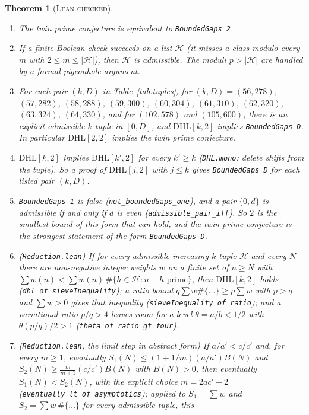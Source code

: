 \documentclass[11pt]{amsart}
\newtheorem{theorem}{Theorem}
\theoremstyle{definition}
\theoremstyle{remark}
\newcommand{\lbl}[1]{\textup{\textsc{#1}}}
\newcommand{\DHL}{\mathrm{DHL}}
\begin{document}
\begin{theorem}[\lbl{Lean-checked}]\label{thm:lean}
\begin{enumerate}
\item The twin prime conjecture is equivalent to \texttt{BoundedGaps 2}.
\item If a finite Boolean check succeeds on a list $\mathcal H$ (it misses a
class modulo every $m$ with $2\le m\le|\mathcal H|$), then $\mathcal H$ is
admissible. The moduli $p>|\mathcal H|$ are handled by a formal pigeonhole
argument.
\item For each pair $(k,D)$ in Table~\ref{tab:tuples}, for
$(k,D)=(56,278)$, $(57,282)$, $(58,288)$, $(59,300)$, $(60,304)$, $(61,310)$,
$(62,320)$, $(63,324)$, $(64,330)$, and for $(102,578)$ and $(105,600)$, there is an explicit admissible $k$-tuple in $[0,D]$, and
$\DHL[k,2]$ implies \texttt{BoundedGaps D}. In particular $\DHL[2,2]$ implies
the twin prime conjecture.
\item $\DHL[k,2]$ implies $\DHL[k',2]$ for every $k'\ge k$
(\texttt{DHL.mono}: delete shifts from the tuple). So a proof of $\DHL[j,2]$
with $j\le k$ gives \texttt{BoundedGaps D} for each listed pair $(k,D)$.
\item \texttt{BoundedGaps 1} is false (\texttt{not\_boundedGaps\_one}), and a
pair $\{0,d\}$ is admissible if and only if $d$ is even
(\texttt{admissible\_pair\_iff}). So $2$ is the smallest bound of this form
that can hold, and the twin prime conjecture is the strongest statement of the
form \texttt{BoundedGaps D}.
\item (\texttt{Reduction.lean}) If for every admissible increasing $k$-tuple
$\mathcal H$ and every $N$ there are non-negative integer weights $w$ on a
finite set of $n\ge N$ with $\sum w(n)<\sum w(n)\,\#\{h\in\mathcal H:n+h\text{ prime}\}$,
then $\DHL[k,2]$ holds (\texttt{dhl\_of\_\allowbreak sieveInequality}); a ratio bound
$q\sum w\#\{\dots\}\ge p\sum w$ with $p>q$ and $\sum w>0$ gives that inequality
(\texttt{sieveInequality\_\allowbreak of\_ratio}); and a variational ratio $p/q>4$ leaves
room for a level $\theta=a/b<1/2$ with $\theta(p/q)/2>1$
(\texttt{theta\_of\_\allowbreak ratio\_gt\_four}).
\item (\texttt{Reduction.lean}, the limit step in abstract form) If
$a/a'<c/c'$ and, for every $m\ge1$, eventually
$S_1(N)\le(1+1/m)(a/a')B(N)$ and $S_2(N)\ge\frac{m}{m+1}(c/c')B(N)$ with
$B(N)>0$, then eventually $S_1(N)<S_2(N)$, with the explicit choice
$m=2ac'+2$ (\texttt{eventually\_lt\_\allowbreak of\_asymptotics}); applied to
$S_1=\sum w$ and $S_2=\sum w\,\#\{\dots\}$ for every admissible tuple, this

\end{enumerate}
\end{theorem}
\end{document}
